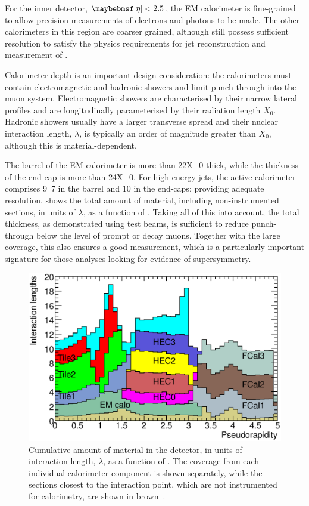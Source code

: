 For the inner detector, $\absEta<2.5$, the EM calorimeter is fine-grained to allow precision measurements of electrons and photons to be made.
The other calorimeters in this region are coarser grained, although still possess sufficient resolution to satisfy the physics requirements for jet reconstruction and measurement of \ETmiss.

Calorimeter depth is an important design consideration: the calorimeters must contain electromagnetic and hadronic showers and limit punch-through into the muon system.
Electromagnetic showers are characterised by their narrow lateral profiles and are longitudinally parameterised by their radiation length $X_0$.
Hadronic showers usually have a larger transverse spread and their nuclear interaction length, $\lambda$, is typically an order of magnitude greater than $X_0$, although this is material-dependent.

The barrel of the EM calorimeter is more than \unit{22}{X_0} thick, while the thickness of the end-cap is more than \unit{24}{X_0}.
For high energy jets, the active calorimeter comprises \unit{9.7}{\lambda} in the barrel and \unit{10}{\lambda} in the end-caps; providing adequate resolution.
 shows the total amount of material, including non-instrumented sections, in units of $\lambda$, as a function of \absEta.
Taking all of this into account, the total thickness, as demonstrated using test beams, is sufficient to reduce punch-through below the level of prompt or decay muons.
Together with the large \pseudorap coverage, this also ensures a good \ETmiss measurement, which is a particularly important signature for those analyses looking for evidence of supersymmetry. 

\begin{figure}[htpb]
  \includegraphics[width=\largefigwidth]{chapters/detector/deadMaterial.eps}
  \caption{Cumulative amount of material in the \ATLAS detector, in units of interaction length, $\lambda$, as a function of \absEta. The coverage from each individual calorimeter component is shown separately, while the sections closest to the interaction point, which are not instrumented for calorimetry, are shown in brown~\cite{ATLAS:2008:detector}.}
  \label{fig:detector:deadMaterial}
\end{figure}

